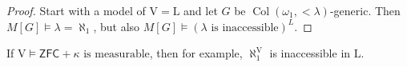 \begin{proof}
    Start with a model of \( \mathrm{V} = \mathrm{L} \) and let \( G \) be \( \operatorname{Col}(\omega_1, <\lambda) \)-generic.
    Then \( M[G] \vDash \lambda = \aleph_1 \), but also \( M[G] \vDash (\lambda \text{ is inaccessible})^L \).
\end{proof}
\begin{remark}
    If \( \mathrm{V} \vDash \mathsf{ZFC} + \kappa \text{ is measurable} \), then for example, \( \aleph_1^{\mathrm{V}} \) is inaccessible in \( \mathrm{L} \).
\end{remark}

